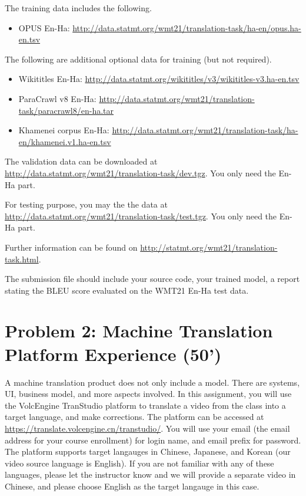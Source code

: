 \documentclass[12pt,letterpaper]{article}
\begin{document}
The training data includes the following.
\begin{itemize}
  \item OPUS En-Ha:
  \url{http://data.statmt.org/wmt21/translation-task/ha-en/opus.ha-en.tsv}
\end{itemize}

The following are additional optional data for training (but not required).
\begin{itemize}
  \item Wikititles En-Ha:
  \url{http://data.statmt.org/wikititles/v3/wikititles-v3.ha-en.tsv}
  \item ParaCrawl v8 En-Ha:
  \url{http://data.statmt.org/wmt21/translation-task/paracrawl8/en-ha.tar}
  \item Khamenei corpus En-Ha:
  \url{http://data.statmt.org/wmt21/translation-task/ha-en/khamenei.v1.ha-en.tsv}
\end{itemize}

The validation data can be downloaded at \url{http://data.statmt.org/wmt21/translation-task/dev.tgz}.
You only need the En-Ha part.

For testing purpose, you may the the data at \url{http://data.statmt.org/wmt21/translation-task/test.tgz}. You only need the En-Ha part. 

Further information can be found on \url{http://statmt.org/wmt21/translation-task.html}.

The submission file should include your source code, your trained model, a report stating the BLEU score evaluated on the WMT21 En-Ha test data. 

\section*{Problem 2: Machine Translation Platform Experience (50')} 
A machine translation product does not only include a model. There are systems, UI, business model, and more aspects involved. 
In this assignment, you will use the VolcEngine TranStudio platform to translate a video from the class into a target language, and make corrections. 
The platform can be accessed at \url{https://translate.volcengine.cn/transtudio/}. You will use your email (the email address for your course enrollment) for login name, and email prefix for password. 
The platform supports target langauges in Chinese, Japanese, and Korean (our video source language is English).  If you are not familiar with any of these languages, please let the instructor know and we will provide a separate video in Chinese, and please choose English as the target langauge in this case. 
\end{document}
